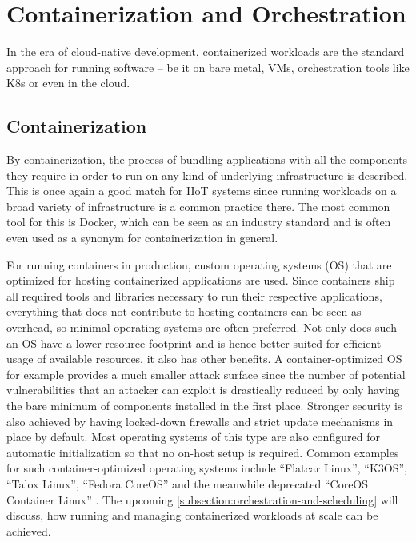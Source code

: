 \section{Containerization and Orchestration}
\label{section:orchestration-scheduling}

    In the era of cloud-native development, containerized workloads are the standard approach for running software -- be it on bare metal, VMs, orchestration tools like K8s or even in the cloud.

    \subsection{Containerization}
    \label{subsection:containers-and-os}
    
    By containerization, the process of bundling applications with all the components they require in order to run on any kind of underlying infrastructure is described. This is once again a good match for IIoT systems since running workloads on a broad variety of infrastructure is a common practice there. The most common tool for this is Docker, which can be seen as an industry standard and is often even used as a synonym for containerization in general. 
    
    For running containers in production, custom operating systems (OS) that are optimized for hosting containerized applications are used. Since containers ship all required tools and libraries necessary to run their respective applications, everything that does not contribute to hosting containers can be seen as overhead, so minimal operating systems are often preferred. Not only does such an OS have a lower resource footprint and is hence better suited for efficient usage of available resources, it also has other benefits. A container-optimized OS for example provides a much smaller attack surface since the number of potential vulnerabilities that an attacker can exploit is drastically reduced by only having the bare minimum of components installed in the first place. Stronger security is also achieved by having locked-down firewalls and strict update mechanisms in place by default. Most operating systems of this type are also configured for automatic initialization so that no on-host setup is required. Common examples for such container-optimized operating systems include ``Flatcar Linux'', ``K3OS'', ``Talox Linux'', ``Fedora CoreOS'' and the meanwhile deprecated ``CoreOS Container Linux'' \cite{google_container_optimized}. The upcoming \autoref{subsection:orchestration-and-scheduling} will discuss, how running and managing containerized workloads at scale can be achieved.
    
